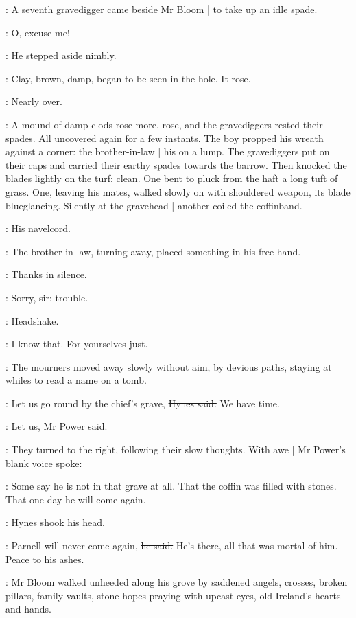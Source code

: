:
A seventh gravedigger came beside Mr Bloom |
to take up an idle spade.

\Bloom:
O, excuse me!

:
He stepped aside nimbly.

:
Clay, brown, damp, began to be seen in the hole.
It rose.

\BloomInt:
Nearly over.

:
A mound of damp clods rose more, rose,
and the gravediggers rested their spades.
All uncovered again for a few instants.
The boy propped his wreath against a corner:
the brother-in-law |
his on a lump.
The gravediggers put on their caps
and carried their earthy spades towards the barrow.
Then knocked the blades lightly on the turf:
clean.
One bent to pluck from the haft a long tuft of grass.
One, leaving his mates, walked slowly on with shouldered weapon,
its blade blueglancing.
Silently at the gravehead |
another coiled the coffinband.

\BloomInt:
His navelcord.

:
The brother-in-law, turning away,
placed something in his free hand.

\BloomInt:
Thanks in silence.

\gravedigger:
Sorry, sir:
trouble.

\BloomInt:
Headshake.

\brotherInLaw:
I know that.
For yourselves just.

:
The mourners moved away slowly without aim, by devious paths,
staying at whiles to read a name on a tomb.

\hynes:
Let us go round by the chief's grave,
\sout{Hynes said.}
We have time.

\power:
Let us,
\sout{Mr Power said.}

:
They turned to the right, following their slow thoughts.
With awe |
Mr Power's blank voice spoke:

\power:
Some say he is not in that grave at all.
That the coffin was filled with stones.
That one day he will come again.

:
Hynes shook his head.

\hynes:
Parnell will never come again,
\sout{he said.}
He's there, all that was mortal of him.
Peace to his ashes.

:
Mr Bloom walked unheeded along his grove
by saddened angels, crosses, broken pillars,
family vaults,
stone hopes praying with upcast eyes,
old Ireland's hearts and hands.

